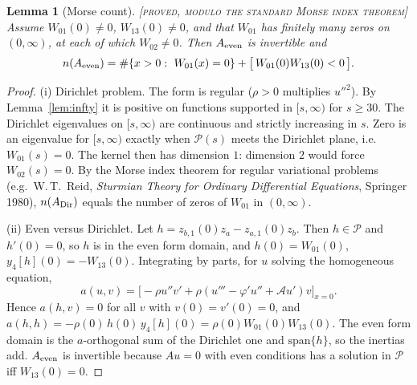 \documentclass[11pt]{amsart}
\newtheorem{lemma}[theorem]{Lemma}
\theoremstyle{definition}
\theoremstyle{remark}
\newcommand{\lab}[1]{\textup{\textsc{[#1]}}}
\begin{document}
\begin{lemma}[Morse count]\label{lem:morse}\lab{proved, modulo the standard Morse index theorem}
Assume $W_{01}(0)\ne0$, $W_{13}(0)\ne0$, and that $W_{01}$ has finitely many zeros on $(0,\infty)$, at each of which $W_{02}\neq0$. Then $A_{\rm even}$ is invertible and
\[
n(A_{\rm even})=\#\{x>0:\ W_{01}(x)=0\}+\big[\,W_{01}(0)W_{13}(0)<0\,\big].
\]
\end{lemma}
\begin{proof}
(i) Dirichlet problem. The form is regular ($\rho>0$ multiplies $u''^2$). By Lemma~\ref{lem:infty} it is positive on functions supported in $[s,\infty)$ for $s\ge30$. The Dirichlet eigenvalues on $[s,\infty)$ are continuous and strictly increasing in $s$. Zero is an eigenvalue for $[s,\infty)$ exactly when $\mathcal P(s)$ meets the Dirichlet plane, i.e.\ $W_{01}(s)=0$. The kernel then has dimension $1$: dimension $2$ would force $W_{02}(s)=0$. By the Morse index theorem for regular variational problems (e.g.\ W.\,T.~Reid, \emph{Sturmian Theory for Ordinary Differential Equations}, Springer 1980), $n(A_{\rm Dir})$ equals the number of zeros of $W_{01}$ in $(0,\infty)$.

(ii) Even versus Dirichlet. Let $h=z_{b,1}(0)z_a-z_{a,1}(0)z_b$. Then $h\in\mathcal P$ and $h'(0)=0$, so $h$ is in the even form domain, and $h(0)=W_{01}(0)$, $y_4[h](0)=-W_{13}(0)$. Integrating by parts, for $u$ solving the homogeneous equation,
\[
a(u,v)=\big[-\rho u''v'+\rho(u'''-\varphi'u''+\mathcal Au')v\big]_{x=0}.
\]
Hence $a(h,v)=0$ for all $v$ with $v(0)=v'(0)=0$, and $a(h,h)=-\rho(0)\,h(0)\,y_4[h](0)=\rho(0)W_{01}(0)W_{13}(0)$. The even form domain is the $a$-orthogonal sum of the Dirichlet one and $\mathrm{span}\{h\}$, so the inertias add. $A_{\rm even}$ is invertible because $Au=0$ with even conditions has a solution in $\mathcal P$ iff $W_{13}(0)=0$.
\end{proof}
\end{document}
